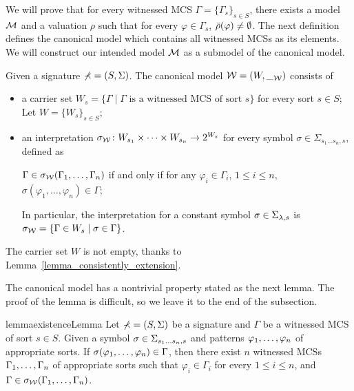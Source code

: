 \documentclass{amsart}
\begin{document}
We will prove that for every witnessed MCS 
$\Gamma = \{ \Gamma_s \}_{s \in S}$,
there exists a model $\mathcal{M}$ and a valuation $\rho$ such that
for every $\varphi \in \Gamma_s$, $\bar{\rho}(\varphi) \neq \emptyset$.
The next definition defines the canonical model which
contains all witnessed MCSs as its elements.
We will construct our intended model $\mathcal{M}$ as a submodel of
the canonical model.

\begin{definition}
\label{def_canonical_model}
Given a signature $\mathbb{\Sigma} = (S,\Sigma)$.
The canonical model 
$\mathcal{W} = (W,\__{\mathcal{W}})$ 
consists of
\begin{itemize}
\item a carrier set 
      $W_s = \{ \Gamma 
               \mid \text{$\Gamma$ is a witnessed MCS of sort $s$} \}$
       for every sort $s \in S$;
       Let $W = \{ W_s \}_{s \in S}$;
\item an interpretation 
      ${\sigma_{\mathcal{W}}} \colon W_{s_1} \times \dots \times W_{s_n} \to 2^{W_s}$
      for every symbol 
      $\sigma \in \Sigma_{s_1 \dots s_n , s}$,
      defined as
      \begin{center}
        $\Gamma \in {\sigma_{\mathcal{W}}}(\Gamma_1,\dots,\Gamma_n)$
        \quad if and only if \quad
        for any $\varphi_i \in \Gamma_i$, $1 \le i \le n$,
        $\sigma(\varphi_1,\dots,\varphi_n) \in \Gamma$;
      \end{center}
      In particular, the interpretation for a constant symbol $\sigma \in \Sigma_{\lambda,s}$
      is $\sigma_{\mathcal{W}} = \{ \Gamma \in W_s \mid \sigma \in \Gamma \}$.
\end{itemize}
The carrier set $W$ is not empty,
thanks to Lemma~\ref{lemma_consistently_extension}.

\end{definition}

The canonical model has a nontrivial property stated as the next lemma.
The proof of the lemma is difficult, so we leave it to the end of the subsection.

\begin{restatable}{lemma}{existenceLemma}
\label{lemma_existence_of_witmodels}
Let $\mathbb{\Sigma} = (S,\Sigma)$ be a signature
and $\Gamma$ be a witnessed MCS of sort $s \in S$.
Given a symbol $\sigma \in \Sigma_{s_1 \dots s_n , s}$
and patterns $\varphi_1 ,\dots, \varphi_n$ of appropriate sorts.
If $\sigma(\varphi_1 ,\dots, \varphi_n) \in \Gamma$,
then there exist $n$ witnessed MCSs
$\Gamma_1  ,\dots,
 \Gamma_n $ of appropriate sorts
such that
$\varphi_i \in \Gamma_i$ for every $1 \le i \le n$, and
$\Gamma \in \sigma_{\mathcal{W}}( \Gamma_1 ,\dots, \Gamma_n )$.
\end{restatable}
\end{document}

